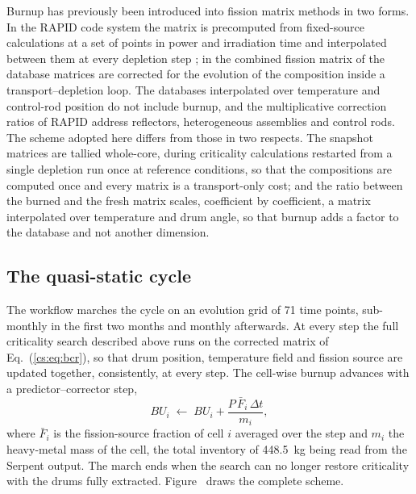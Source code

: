 Burnup has previously been introduced into fission matrix methods in two
forms. In the RAPID
code system the matrix is precomputed from fixed-source calculations at a
set of points in power and irradiation time and interpolated between them at
every depletion step \cite{pungercic2023brapid}; in the combined fission
matrix of \citet{he2024combined} the database matrices are corrected for the
evolution of the composition inside a transport--depletion loop. The
databases interpolated over temperature and control-rod position
\cite{Topham2020,RauWaltersNSE2021} do not include burnup, and the
multiplicative correction ratios of RAPID \cite{HeANE2019,HePNE2020} address
reflectors, heterogeneous assemblies and control rods. The scheme adopted
here differs from those in two respects. The snapshot matrices are tallied
whole-core, during criticality calculations restarted from a single
depletion run once at reference conditions, so that the compositions are
computed once and every matrix is a transport-only cost; and the ratio
between the burned and the fresh matrix scales, coefficient by coefficient, a
matrix interpolated over temperature and drum angle, so that burnup adds a
factor to the database and not another dimension.

\subsection{The quasi-static cycle}\label{cs:sec:cycle}

The workflow marches the cycle on an evolution grid of 71 time points,
sub-monthly in the first two months and monthly afterwards. At
every step the full criticality search described above runs on the corrected
matrix
of Eq.~(\ref{cs:eq:bcr}), so that drum position, temperature field and
fission source are updated together, consistently, at every step. The
cell-wise burnup advances with a predictor--corrector step,
%
\begin{equation}
  BU_i \;\leftarrow\; BU_i + \frac{P\,\bar F_i\,\Delta t}{m_i},
  \label{cs:eq:bustep}
\end{equation}
%
where $\bar F_i$ is the fission-source fraction of cell $i$ averaged over the
step and $m_i$ the heavy-metal mass of the cell, the total inventory of
\SI{448.5}{kg} being read from the Serpent output. The march ends when the
search can no longer restore criticality with the drums fully extracted.
Figure~ draws the complete scheme.

